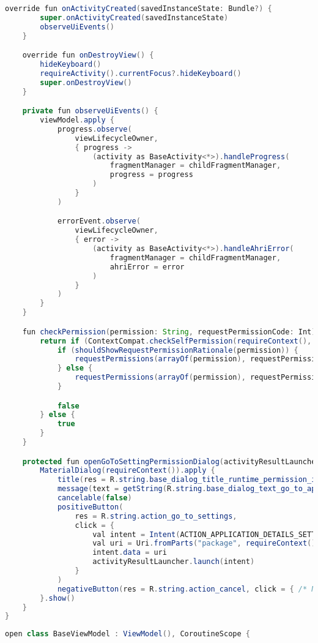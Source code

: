 \begin{asection}
\begin{lstlisting}[language=Java,label={lst:add:a_2}, caption={BaseFragment}]
    override fun onActivityCreated(savedInstanceState: Bundle?) {
        super.onActivityCreated(savedInstanceState)
        observeUiEvents()
    }

    override fun onDestroyView() {
        hideKeyboard()
        requireActivity().currentFocus?.hideKeyboard()
        super.onDestroyView()
    }

    private fun observeUiEvents() {
        viewModel.apply {
            progress.observe(
                viewLifecycleOwner,
                { progress ->
                    (activity as BaseActivity<*>).handleProgress(
                        fragmentManager = childFragmentManager,
                        progress = progress
                    )
                }
            )

            errorEvent.observe(
                viewLifecycleOwner,
                { error ->
                    (activity as BaseActivity<*>).handleAhriError(
                        fragmentManager = childFragmentManager,
                        ahriError = error
                    )
                }
            )
        }
    }

    fun checkPermission(permission: String, requestPermissionCode: Int): Boolean {
        return if (ContextCompat.checkSelfPermission(requireContext(), permission) != PackageManager.PERMISSION_GRANTED) {
            if (shouldShowRequestPermissionRationale(permission)) {
                requestPermissions(arrayOf(permission), requestPermissionCode)
            } else {
                requestPermissions(arrayOf(permission), requestPermissionCode)
            }

            false
        } else {
            true
        }
    }

    protected fun openGoToSettingPermissionDialog(activityResultLauncher: ActivityResultLauncher<Intent>) {
        MaterialDialog(requireContext()).apply {
            title(res = R.string.base_dialog_title_runtime_permission_is_denied)
            message(text = getString(R.string.base_dialog_text_go_to_application_settings))
            cancelable(false)
            positiveButton(
                res = R.string.action_go_to_settings,
                click = {
                    val intent = Intent(ACTION_APPLICATION_DETAILS_SETTINGS)
                    val uri = Uri.fromParts("package", requireContext().packageName, null)
                    intent.data = uri
                    activityResultLauncher.launch(intent)
                }
            )
            negativeButton(res = R.string.action_cancel, click = { /* Nothing */ })
        }.show()
    }
}
\end{lstlisting}
\begin{lstlisting}[language=Java,label={lst:add:a_3}, caption={BaseViewModel}]
open class BaseViewModel : ViewModel(), CoroutineScope {


\end{lstlisting}
\end{asection}
